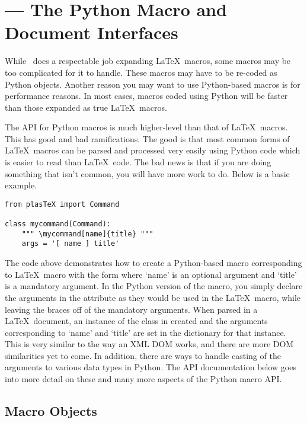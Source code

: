 
\section{ --- The Python Macro and Document Interfaces\label{sec:macros-api}}


While \plasTeX\ does a respectable job expanding \LaTeX\ macros, some macros
may be too complicated for it to handle.  These macros may have to be re-coded
as Python objects.  Another reason you may want to use Python-based macros
is for performance reasons.  In most cases, macros coded using Python will
be faster than those expanded as true \LaTeX\ macros.

The API for Python macros is much higher-level than that of \LaTeX\ macros.
This has good and bad ramifications.  The good is that most common forms
of \LaTeX\ macros can be parsed and processed very easily using Python code
which is easier to read than \LaTeX\ code.  The bad news is that if you 
are doing something that isn't common, you will have more work to do.
Below is a basic example.

\begin{verbatim}
from plasTeX import Command

class mycommand(Command):
    """ \mycommand[name]{title} """
    args = '[ name ] title'
\end{verbatim}

The code above demonstrates how to create a Python-based macro corresponding
to \LaTeX\ macro with the form  where `name'
is an optional argument and `title' is a mandatory argument.  In the Python
version of the macro, you simply declare the arguments in the 
attribute as they would be used in the \LaTeX\ macro, while leaving the braces
off of the mandatory arguments.  When parsed in a \LaTeX\ document, an instance
of the class  in created and the arguments corresponding to
`name' and `title' are set in the  dictionary for that 
instance.  This is very similar to the way an XML DOM works, and there are
more DOM similarities yet to come.  In addition, there are ways to handle
casting of the arguments to various data types in Python.  The API documentation
below goes into more detail on these and many more aspects of the Python
macro API.

\subsection{Macro Objects}


